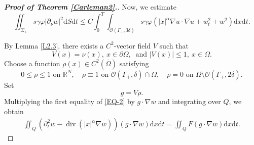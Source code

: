 \documentclass[10pt,a4paper]{amsart}
\DeclareMathOperator{\Div}{div}
\def\Ga{\Gamma}
\def\Om{\Omega}
\newcommand{\R}{\mathbb R}
\def\al{\alpha}
\def\bf{\textbf}
\def\de{\delta}
\def\df{\mathrm d}
\def\ga{\gamma}
\def\mcO{\mathcal{O}}
\def\ol{\overline}
\def\pt{\partial}
\def\se{\setminus}
\def\vp{\varphi}
\begin{document}
\begin{proof}[{\rm \bf { Proof of  Theorem \ref{Carleman2}.}}]
			
			Now, we  estimate
			\begin{equation*}
				\iint_{\Sigma_+}  s\ga \vp  |\pt_\nu w|^2\df S\df t\leq C  \int_0^T\int_{\mcO(\Ga_+,3\de)}   s\ga \vp\left(|x|^\al \nabla u\cdot \nabla u+w_t^2+w^2\right)\df x\df t .
			\end{equation*}
			
			
			
			By Lemma \ref{L2.3}, there exists a $C^2$-vector field $V$ such that
			\begin{equation*}
				V(x)=\nu(x), \ x\in\pt\Om, \ \mbox{ and } |V(x)|\leq 1, \ x\in\Om.
			\end{equation*}
			Choose a function $\rho(x)\in C^2(\ol\Om)$ satisfying
			\begin{equation*}
				0\leq \rho\leq 1 \mbox{ on }\R^N,\quad \rho\equiv 1 \mbox{ on } \mcO(\Ga_+, \de)\cap \Om, \quad \rho=0 \mbox{ on }\Om\se \mcO(\Ga_+, 2\de).
			\end{equation*}
			Set
			\begin{equation*}
				g=V\rho .
			\end{equation*}
			Multiplying the first equality of \eqref{EQ-2} by  $g\cdot \nabla w$ and integrating over  $Q$, we obtain
			\begin{equation*}
				\begin{split}
					\iint_Q\left(\pt_t^2w-\Div(|x|^\al \nabla w)\right) (g\cdot \nabla w)\df x\df t=\iint_Q F(g\cdot \nabla w)\df x\df t.
				\end{split}
			\end{equation*}
			

\end{proof}
\end{document}
